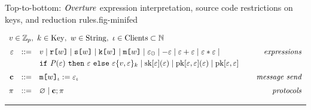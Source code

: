\begin{fpfig}[t]{Top-to-bottom: $\mathit{Overture}$ expression interpretation, source code restrictions on keys, and reduction rules.}{fig-minifed}
  {\small
    $$
    \begin{array}{rcl@{\hspace{8mm}}r}
      \multicolumn{4}{l}{v \in \mathbb{Z}_p,\ k \in \mathrm{Key},\ w \in \mathrm{String},\ \cid \in \mathrm{Clients} \subset  \mathbb{N} }\\[2mm] %
      \be &::=& v \mid \flip{w} \mid \secret{w} \mid \key{w} \mid \mesg{w} \mid \elab{\be}{\Oracle} \mid \fminus \be \mid \be \fplus \be \mid \be \ftimes \be \mid & \textit{expressions}\\[1mm]
      & &  \select{\fp(\be)}{\be}{\be} \ctxt{v,\be}{k}  \mid \sk{\be}(\be) \mid \pk{\be}{\be}(\be) \mid \pk{\be}{\be} \\[2mm]
      \instr &::=& \eassign{\mesg{w}}{\cid}{\be}{\cid} & \textit{message send} \\[2mm]
      \prog &::=& \varnothing \mid \instr; \prog & \textit{protocols}
    \end{array}
    $$
  
  \rule{130mm}{0.5pt}

}
\end{fpfig}
